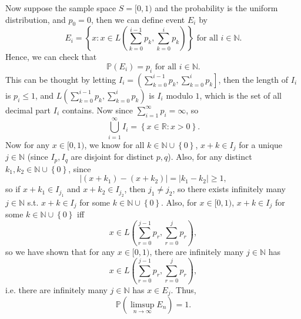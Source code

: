 \documentclass[a4paper,12pt]{article}
\begin{document}
Now suppose the sample space \(S = [0, 1)\) and the probability is the uniform distribution, and \(p_0 = 0\), then we can define event \(E_i\) by  
\[
	E_i = \left\{ x: x \in L \left( \sum_{k=0}^{i-1} p_k, \sum_{k=0}^i p_k   \right)  \right\} \text{ for all } i \in \mathbb{N}. 
\] 
Hence, we can check that 
\[
	\mathbb{P} (E_i) = p_i \text{ for all } i \in \mathbb{N}.  
\]
This can be thought by letting \(I_i = \left( \sum_{k=0}^{i-1} p_k, \sum_{k=0}^i p_k   \right] \), then the length of \(I_i\) is \(p_i \le 1\), and \(L \left( \sum_{k=0}^{i-1} p_k, \sum_{k=0}^i p_k   \right)\) is \(I_i\) modulo \(1\), which is the set of all decimal part \(I_i\) contains. Now since \(\sum_{i=1}^{\infty} p_i = \infty \), so 
\[
	\bigcup_{i=1}^{\infty } I_i = \left\{ x \in \mathbb{R} : x > 0 \right\}.  
\]      
Now for any \(x \in [0, 1)\), we know for all \(k \in \mathbb{N} \cup \left\{ 0 \right\} \), \(x + k \in I_j\) for a unique \(j \in \mathbb{N} \) (since \(I_p, I_q\) are disjoint for distinct \(p, q\)). Also, for any distinct \(k_1, k_2 \in \mathbb{N} \cup \left\{ 0 \right\}  \),  since
\[
	\vert (x + k_1) - (x + k_2) \vert = \vert k_1 - k_2 \vert \ge 1,  
\]   
so if \(x + k_1 \in I_{j_1}\) and \(x + k_2 \in I_{j_2}\), then \(j_1 \neq j_2\), so there exists infinitely many \(j \in \mathbb{N} \) s.t. \(x + k \in I_j\) for some \(k \in \mathbb{N} \cup \left\{ 0 \right\} \). Also, for \(x \in [0, 1)\), \(x + k \in I_j\) for some \(k \in \mathbb{N} \cup \left\{ 0 \right\} \) iff
\[
	x \in L \left( \sum_{r=0}^{j-1} p_r, \sum_{r=0}^j p_r   \right), 
\]    
so we have shown that for any \(x \in [0, 1)\), there are infinitely many \(j \in \mathbb{N} \) has 
\[
	x \in L \left( \sum_{r=0}^{j-1} p_r, \sum_{r=0}^j p_r   \right),
\]   
i.e. there are infinitely many \(j \in \mathbb{N} \) has \(x \in E_j\). Thus, 
\[
	\mathbb{P} (\limsup_{n \to \infty} E_n ) = 1.
\]  



\end{document}
